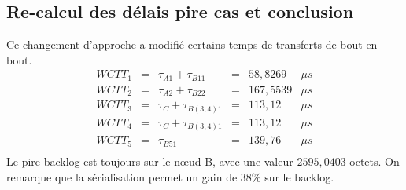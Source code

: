 \subsection{Re-calcul des délais pire cas et conclusion}
Ce changement d'approche a modifié certains temps de transferts de bout-en-bout. 
\begin{equation}
\begin{array}{lclcll}
WCTT_1	&=&	\tau_{A1} + \tau_{B11} 	&=& 58,8269&\mu s\\
WCTT_2	&=&	\tau_{A2} + \tau_{B22} 	&=& 167,5539&\mu s\\
WCTT_3	&=&	\tau_{C} + \tau_{B(3,4)1} 	&=& 113,12&\mu s\\
WCTT_4	&=&	\tau_{C} + \tau_{B(3,4)1} &=& 113,12	&\mu s\\
WCTT_5	&=&	\tau_{B51} 				&=& 139,76	&\mu s\\
\end{array}
\end{equation}
Le pire backlog est toujours sur le n\oe ud B, avec une valeur $2595,0403$ octets.
On remarque que la sérialisation permet un gain de 38\% sur le backlog.


